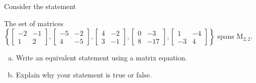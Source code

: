
\begin{exerciseStatement}


Consider the statement 
\begin{center}\begin{minipage}{0.8\textwidth}
 The set of matrices \( \left\{ \left[\begin{array}{cc}
-2 & -1 \\
1 & 2
\end{array}\right] , \left[\begin{array}{cc}
-5 & -2 \\
4 & -5
\end{array}\right] , \left[\begin{array}{cc}
4 & -2 \\
3 & -1
\end{array}\right] , \left[\begin{array}{cc}
0 & -3 \\
8 & -17
\end{array}\right] , \left[\begin{array}{cc}
1 & -4 \\
-3 & 4
\end{array}\right] \right\} \) spans \(\mathrm{M}_{2,2}\). 
\end{minipage}\end{center}
    


\begin{enumerate}[(a)]
\item  Write an equivalent statement using a matrix equation.
\item  Explain why your statement is true or false.
\end{enumerate}
    
\end{exerciseStatement}
    

